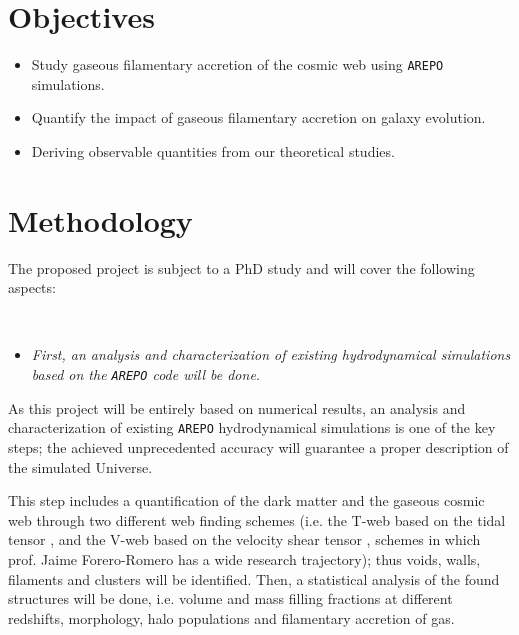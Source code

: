 \documentclass[a4,useAMS,usenatbib,usegraphicx,12pt]{article}
\begin{document}

\newpage
\section{Objectives}


\begin{itemize}

\item[\checkmark] Study gaseous filamentary accretion of the cosmic web using 
\texttt{AREPO} simulations.

\item[\checkmark] Quantify the impact of gaseous filamentary accretion on galaxy 
evolution.

\item[\checkmark] Deriving observable quantities from our theoretical studies.


\end{itemize}



\section{Methodology}


The proposed project is subject to a PhD study and will cover the following 
aspects:

\

\begin{itemize}

\item[\checkmark] \textit{First, an analysis and characterization of existing 
hydrodynamical simulations based on the \texttt{AREPO} code will be done.}

\end{itemize}

As this project will be entirely based on numerical results, an analysis and 
characterization of existing \texttt{AREPO} hydrodynamical simulations is one 
of the key steps; the achieved unprecedented accuracy will guarantee a proper 
description of the simulated Universe.


This step includes a quantification of the dark matter and the gaseous cosmic
web through two different web finding schemes (i.e. the T-web based on the 
tidal tensor \citep{Hahn07,Forero09}, and the V-web based on the velocity shear
tensor \citep{Hoffman12}, schemes in which prof. Jaime Forero-Romero has a wide 
research trajectory); thus voids, walls, filaments and clusters will be 
identified. Then, a statistical analysis of the found structures will be done, 
i.e. volume and mass filling fractions at different redshifts, morphology, halo 
populations and filamentary accretion of gas.
\end{document}
